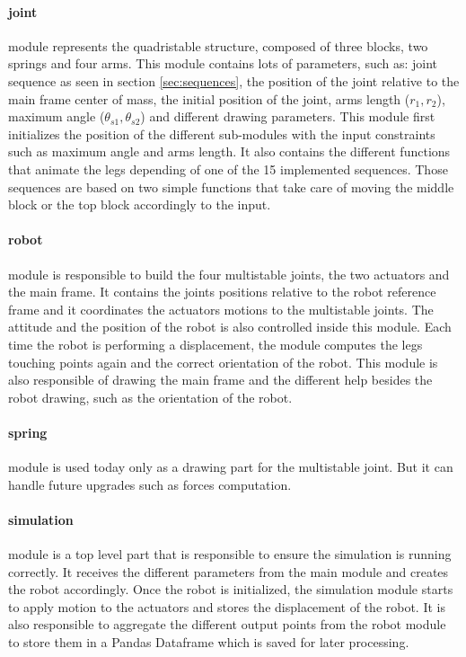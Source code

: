         \paragraph{joint}
            module represents the quadristable structure, composed of three blocks, two springs and four arms. This module contains lots of parameters, such as: joint sequence as seen in section \ref{sec:sequences}, the position of the joint relative to the main frame center of mass, the initial position of the joint, arms length ($r_1, r_2$), maximum angle ($\theta_{s1}, \theta_{s2}$) and different drawing parameters. This module first initializes the position of the different sub-modules with the input constraints such as maximum angle and arms length. It also contains the different functions that animate the legs depending of one of the 15 implemented sequences. Those sequences are based on two simple functions that take care of moving the middle block or the top block accordingly to the input.
        \paragraph{robot}
            module is responsible to build the four multistable joints, the two actuators and the main frame. It contains the joints positions relative to the robot reference frame and it coordinates the actuators motions to the multistable joints. The attitude and the position of the robot is also controlled inside this module. Each time the robot is performing a displacement, the module computes the legs touching points again and the correct orientation of the robot. This module is also responsible of drawing the main frame and the different help besides the robot drawing, such as the orientation of the robot.
        \paragraph{spring}
            module is used today only as a drawing part for the multistable joint. But it can handle future upgrades such as forces computation. 
        \paragraph{simulation}
            module is a top level part that is responsible to ensure the simulation is running correctly. It receives the different parameters from the main module and creates the robot accordingly. Once the robot is initialized, the simulation module starts to apply motion to the actuators and stores the displacement of the robot. It is also responsible to aggregate the different output points from the robot module to store them in a Pandas Dataframe which is saved for later processing. 
